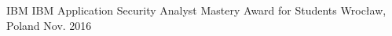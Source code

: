 
\begin{cventries}

  \cventry
    {IBM} 
    {IBM Application Security Analyst Mastery Award for Students} %
    {Wrocław, Poland} %
    {Nov. 2016} %
    {}
\end{cventries}
